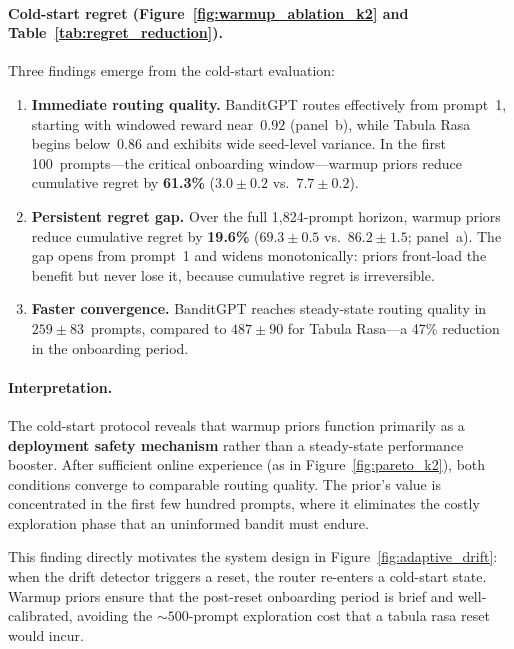 \paragraph{Cold-start regret (Figure~\ref{fig:warmup_ablation_k2}
and Table~\ref{tab:regret_reduction}).}
Three findings emerge from the cold-start evaluation:

\begin{enumerate}[leftmargin=*,noitemsep]
  \item \textbf{Immediate routing quality.}
        BanditGPT routes effectively from prompt~1, starting
        with windowed reward near~$0.92$ (panel~b), while Tabula
        Rasa begins below~$0.86$ and exhibits wide seed-level
        variance.
        In the first 100~prompts---the critical onboarding
        window---warmup priors reduce cumulative regret by
        \textbf{61.3\%} ($3.0 \pm 0.2$ vs.\ $7.7 \pm 0.2$).
  \item \textbf{Persistent regret gap.}
        Over the full 1{,}824-prompt horizon, warmup priors
        reduce cumulative regret by \textbf{19.6\%}
        ($69.3 \pm 0.5$ vs.\ $86.2 \pm 1.5$; panel~a).
        The gap opens from prompt~1 and widens monotonically:
        priors front-load the benefit but never lose it,
        because cumulative regret is irreversible.
  \item \textbf{Faster convergence.}
        BanditGPT reaches steady-state routing quality in
        $259 \pm 83$~prompts, compared to $487 \pm 90$ for
        Tabula Rasa---a 47\% reduction in the onboarding period.
\end{enumerate}

\paragraph{Interpretation.}
The cold-start protocol reveals that warmup priors function
primarily as a \textbf{deployment safety mechanism} rather than
a steady-state performance booster.
After sufficient online experience (as in Figure~\ref{fig:pareto_k2}),
both conditions converge to comparable routing quality.
The prior's value is concentrated in the first few hundred prompts,
where it eliminates the costly exploration phase that an uninformed
bandit must endure.

This finding directly motivates the system design in
Figure~\ref{fig:adaptive_drift}: when the drift detector triggers a
reset, the router re-enters a cold-start state.
Warmup priors ensure that the post-reset onboarding period
is brief and well-calibrated, avoiding the ${\sim}500$-prompt
exploration cost that a tabula rasa reset would incur.

